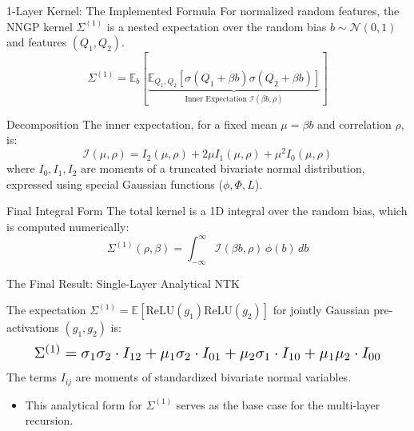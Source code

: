 \documentclass{beamer}
\begin{document}
\begin{frame}[fragile]{1-Layer Kernel: The Implemented Formula}
For normalized random features, the NNGP kernel $\Sigma^{(1)}$ is a nested expectation over the random bias $b \sim \mathcal{N}(0,1)$ and features $(Q_1, Q_2)$.
\begin{equation*}
\Sigma^{(1)} = \mathbb{E}_{b} \left[ \underbrace{\mathbb{E}_{Q_1, Q_2} \left[ \sigma(Q_1 + \beta b) \sigma(Q_2 + \beta b) \right]}_{\text{Inner Expectation } \mathcal{I}(\beta b, \rho)} \right]
\end{equation*}
\begin{block}{Decomposition}
The inner expectation, for a fixed mean $\mu=\beta b$ and correlation $\rho$, is:
\begin{equation*}
\mathcal{I}(\mu, \rho) = I_2(\mu, \rho) + 2\mu I_1(\mu, \rho) + \mu^2 I_0(\mu, \rho)
\end{equation*}
where $I_0, I_1, I_2$ are moments of a truncated bivariate normal distribution, expressed using special Gaussian functions ($\phi, \Phi, L$).
\end{block}
\begin{alertblock}{Final Integral Form}
The total kernel is a 1D integral over the random bias, which is computed numerically:
\begin{equation*}
\Sigma^{(1)}(\rho, \beta) = \int_{-\infty}^{\infty} \mathcal{I}(\beta b, \rho) \, \phi(b) \, db
\end{equation*}
\end{alertblock}
\end{frame}

\begin{frame}{The Final Result: Single-Layer Analytical NTK}
\begin{theorem}
The expectation $\Sigma^{(1)} = \mathbb{E}[\text{ReLU}(g_1)\text{ReLU}(g_2)]$ for jointly Gaussian pre-activations $(g_1, g_2)$ is:
\begin{equation*}
\resizebox{0.9\hsize}{!}{$\Sigma^{(1)} = \sigma_1\sigma_2 \cdot I_{12} + \mu_1\sigma_2 \cdot I_{01} + \mu_2\sigma_1 \cdot I_{10} + \mu_1\mu_2 \cdot I_{00}$}
\end{equation*}
The terms $I_{ij}$ are moments of standardized bivariate normal variables.
\end{theorem}
\begin{itemize}
    \item This analytical form for $\Sigma^{(1)}$ serves as the base case for the multi-layer recursion.
\end{itemize}
\end{frame}
\end{document}
